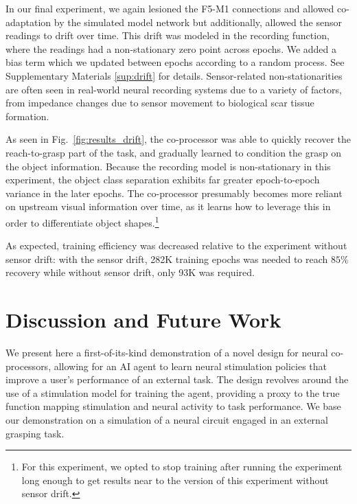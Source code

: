 \documentclass[12pt]{iopart}
\begin{document}
In our final experiment, we again lesioned the F5-M1 connections and allowed co-adaptation by the
simulated model network but additionally, allowed the sensor readings to drift over time. This
drift was modeled in the recording function, where the readings had a non-stationary zero point
across epochs. We added a bias term which we updated between epochs according to a random process.
See Supplementary Materials \ref{sup:drift} for details. Sensor-related non-stationarities are
often seen in real-world neural recording systems due to a variety of factors, 
from impedance changes due to sensor movement to biological scar tissue formation. 

As seen in Fig.~\ref{fig:results_drift}, the co-processor was able to quickly 
recover the reach-to-grasp part of the task, and gradually learned to
condition the grasp on the object information. Because the recording model is non-stationary
in this experiment, the object class separation exhibits far greater epoch-to-epoch
variance in the later epochs. The co-processor presumably becomes more
reliant on upstream visual information over time, as it learns how to leverage this
in order to differentiate object shapes.\footnote{For this experiment, we opted to stop training
after running the experiment long enough to get results near to the version
of this experiment without sensor drift.}

As expected, training efficiency was decreased relative to
the experiment without sensor drift: with the sensor drift,
282K training epochs was needed to reach $85\%$ recovery while
without sensor drift,  only 93K was required.

\section{Discussion and Future Work}
\label{sec:discussion}

We present here a first-of-its-kind demonstration of a novel design for neural co-processors,
allowing for an AI agent to learn neural stimulation policies that improve a user's performance
of an external task. The design revolves around the use of a stimulation model for training the
agent, providing a proxy to the true function mapping stimulation and neural activity
to task performance. We base our demonstration on a simulation of a neural circuit engaged in
an external grasping task.
\end{document}
